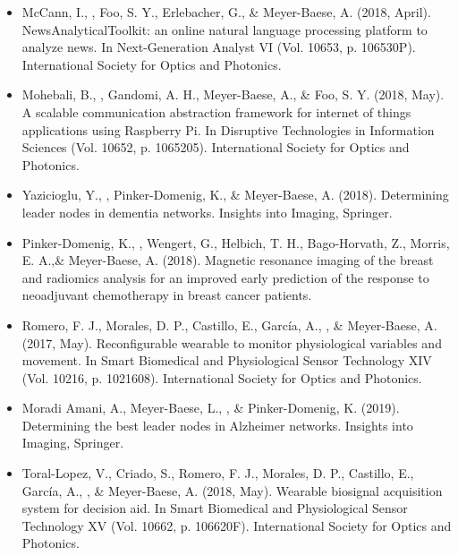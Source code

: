 \documentclass[]{template}
\begin{document}
\begin{itemize}
\item McCann, I., , Foo, S. Y., Erlebacher, G., \& Meyer-Baese, A. (2018, April). NewsAnalyticalToolkit: an online natural language processing platform to analyze news. In Next-Generation Analyst VI (Vol. 10653, p. 106530P). International Society for Optics and Photonics.

\item Mohebali, B., , Gandomi, A. H., Meyer-Baese, A., \& Foo, S. Y. (2018, May). A scalable communication abstraction framework for internet of things applications using Raspberry Pi. In Disruptive Technologies in Information Sciences (Vol. 10652, p. 1065205). International Society for Optics and Photonics.



\item Yazicioglu, Y., , Pinker-Domenig, K., \& Meyer-Baese, A. (2018). Determining leader nodes in dementia networks. Insights into Imaging, Springer.


\item Pinker-Domenig, K., , Wengert, G., Helbich, T. H., Bago-Horvath, Z., Morris, E. A.,\& Meyer-Baese, A. (2018). Magnetic resonance imaging of the breast and radiomics analysis for an improved early prediction of the response to neoadjuvant chemotherapy in breast cancer patients.


\item Romero, F. J., Morales, D. P., Castillo, E., García, A.,  , \& Meyer-Baese, A. (2017, May). Reconfigurable wearable to monitor physiological variables and movement. In Smart Biomedical and Physiological Sensor Technology XIV (Vol. 10216, p. 1021608). International Society for Optics and Photonics.

\item Moradi Amani, A., Meyer-Baese, L., , \& Pinker-Domenig, K. (2019). Determining the best leader nodes in Alzheimer networks. Insights into Imaging, Springer.

\item Toral-Lopez, V., Criado, S., Romero, F. J., Morales, D. P., Castillo, E., García, A., , \& Meyer-Baese, A. (2018, May). Wearable biosignal acquisition system for decision aid. In Smart Biomedical and Physiological Sensor Technology XV (Vol. 10662, p. 106620F). International Society for Optics and Photonics.



\end{itemize}
\end{document}
